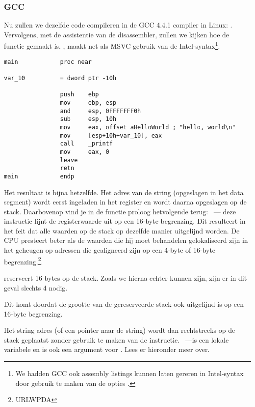 \subsubsection{GCC}

Nu zullen we dezelfde \CCpp code compileren in de GCC 4.4.1 compiler in Linux: .
Vervolgens, met de assistentie van de \IDA disassembler, zullen we kijken hoe de \main functie gemaakt is.
\IDA, maakt net als MSVC gebruik van de Intel-syntax\footnote{We hadden GCC ook assembly listings kunnen laten gereren in Intel-syntax door gebruik te maken van de opties .}.

\begin{lstlisting}[caption=code in \IDA]
main            proc near

var_10          = dword ptr -10h

                push    ebp
                mov     ebp, esp
                and     esp, 0FFFFFFF0h
                sub     esp, 10h
                mov     eax, offset aHelloWorld ; "hello, world\n"
                mov     [esp+10h+var_10], eax
                call    _printf
                mov     eax, 0
                leave
                retn
main            endp
\end{lstlisting}

Het resultaat is bijna hetzelfde.
Het adres van de  string (opgeslagen in het data segment) wordt eerst ingeladen in het \EAX register en wordt daarna opgeslagen op de stack.
Daarbovenop vind je in de functie proloog hetvolgende terug: ~---
deze instructie lijnt de \ESP registerwaarde uit op een 16-byte begrenzing.
Dit resulteert in het feit dat alle waarden op de stack op dezelfde manier uitgelijnd worden.
De CPU presteert beter als de waarden die hij moet behandelen gelokaliseerd zijn in het geheugen op adressen die gealigneerd zijn op een 4-byte of 16-byte begrenzing.\footnote{URLWPDA}.

 reserveert 16 bytes op de stack. Zoals we hierna echter kunnen zijn, zijn er in dit geval slechts 4 nodig.

Dit komt doordat de grootte van de gereserveerde stack ook uitgelijnd is op een 16-byte begrenzing.

Het string adres (of een pointer naar de string) wordt dan rechtstreeks op de stack geplaatst zonder gebruik te maken van de \PUSH instructie.
~---is een lokale variabele en is ook een argument voor \printf{}.
Lees er hieronder meer over.

